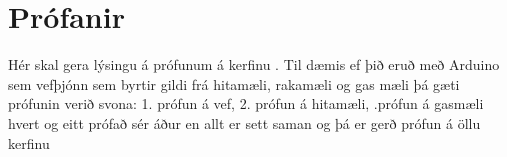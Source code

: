 \section{Prófanir}
Hér skal gera lýsingu á prófunum á kerfinu . Til dæmis ef þið eruð með Arduino sem vefþjónn sem byrtir gildi frá hitamæli, rakamæli og gas mæli þá gæti prófunin verið svona: 1. prófun á vef, 2. prófun á hitamæli, .prófun á gasmæli hvert og eitt prófað sér áður en allt er sett saman og þá er gerð prófun á öllu kerfinu

